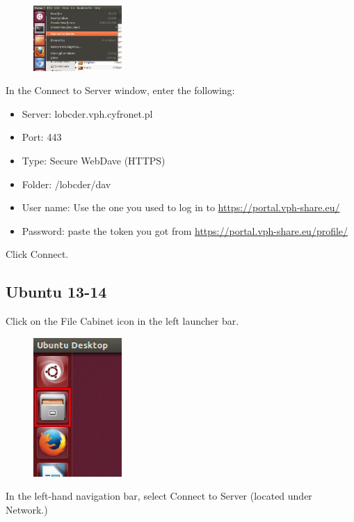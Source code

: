 \documentclass[a4paper,10pt]{report}
\begin{document}
\begin{figure}
	\centering
	\includegraphics[width=0.3\textwidth]{graphics/ver12_2.png}\label{fig:ver12_2.png}
\end{figure}




In the Connect to Server window, enter the following:
\begin{itemize}
 \item Server: lobcder.vph.cyfronet.pl
 \item Port: 443
 \item Type: Secure WebDave (HTTPS)
 \item Folder: /lobcder/dav
 \item User name: Use the one you used to log in to \url{https://portal.vph-share.eu/}
 \item Password: paste the token you got from \url{https://portal.vph-share.eu/profile/}
\end{itemize}


Click Connect.

\subsection{Ubuntu 13-14}

Click on the File Cabinet icon in the left launcher bar.
\begin{figure}
	\centering
	\includegraphics[width=0.3\textwidth]{graphics/ver13_1.png}\label{fig:ver13_1.png}
\end{figure}


In the left-hand navigation bar, select Connect to Server (located under Network.)
\end{document}
